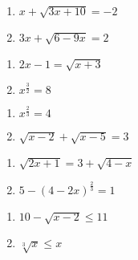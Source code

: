 \begin{multicols}{2}
\begin{enumerate}
\setcounter{enumi}{\value{HW}}


\item  $x + \sqrt{3x+10} = -2$
\item  $3x+\sqrt{6-9x}=2$

\setcounter{HW}{\value{enumi}}
\end{enumerate}
\end{multicols}

\begin{multicols}{2}
\begin{enumerate}
\setcounter{enumi}{\value{HW}}


\item $2x - 1 = \sqrt{x + 3}$
\item $x^{\frac{3}{2}} = 8$

\setcounter{HW}{\value{enumi}}
\end{enumerate}
\end{multicols}

\begin{multicols}{2}
\begin{enumerate}
\setcounter{enumi}{\value{HW}}

\item $x^{\frac{2}{3}} = 4$
\item $\sqrt{x - 2} + \sqrt{x - 5} = 3$

\setcounter{HW}{\value{enumi}}
\end{enumerate}
\end{multicols}

\begin{multicols}{2}
\begin{enumerate}
\setcounter{enumi}{\value{HW}}

\item $\sqrt{2x+1} = 3 + \sqrt{4-x}$
\item  $5 - (4-2x)^{\frac{2}{3}} = 1$

\setcounter{HW}{\value{enumi}}
\end{enumerate}
\end{multicols}

\begin{multicols}{2}
\begin{enumerate}
\setcounter{enumi}{\value{HW}}


\item  $10-\sqrt{x-2} \leq 11$
\item $\sqrt[3]{x} \leq x$

\setcounter{HW}{\value{enumi}}
\end{enumerate}
\end{multicols}

